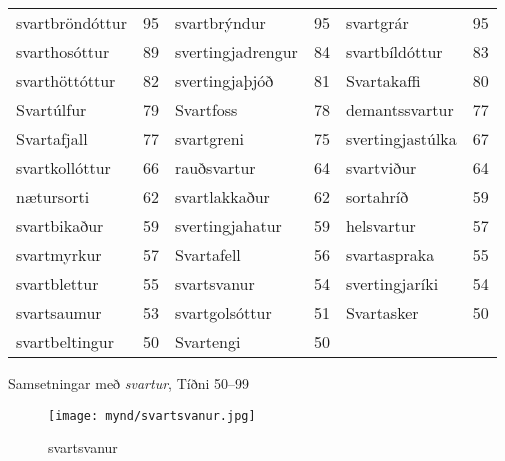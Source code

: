 \documentclass[../samsetningasafn.tex]{subfiles}
\begin{document}
\begin{wordlist}[H]
\begin{tcolorbox}

	\setlength{\extrarowheight}{3pt}
	\begin{tabular}{BlBlBl}
		svartbröndóttur	& 95	& 
		svartbrýndur		& 95	& 
		svartgrár		& 95	\\ 
		svarthosóttur	& 89	& 
		svertingjadrengur	& 84	& 
		svartbíldóttur	& 83	\\ 
		svarthöttóttur	& 82	& 
		svertingjaþjóð	& 81	& 
		Svartakaffi		& 80	\\ 
		Svartúlfur		& 79	& 
		Svartfoss		& 78	& 
		demantssvartur	& 77	\\ 
		Svartafjall		& 77	& 
		svartgreni		& 75	& 
		svertingjastúlka	& 67	\\ 
		svartkollóttur	& 66	& 
		rauðsvartur		& 64	& 
		svartviður		& 64	\\ 
		nætursorti		& 62	& 
		svartlakkaður	& 62	& 
		sortahríð		& 59	\\ 
		svartbikaður		& 59	& 
		svertingjahatur	& 59	& 
		helsvartur		& 57	\\ 
		svartmyrkur		& 57	& 
		Svartafell		& 56	& 
		svartaspraka		& 55	\\ 
		svartblettur		& 55	& 
		svartsvanur		& 54	& 
		svertingjaríki		& 54	\\ 
		svartsaumur		& 53	& 
		svartgolsóttur	& 51	& 
		Svartasker		& 50	\\ 
		svartbeltingur	& 50	& 
		Svartengi		& 50	& 
					&
	\end{tabular}

\end{tcolorbox}
	\caption{Samsetningar með \textit{svartur}, Tíðni 50--99}
	\label{listi:svart.50}
\end{wordlist}

\begin{figure}[H]
\begin{tcolorbox}
\centering
	\texttt{[image: mynd/svartsvanur.jpg]}
\end{tcolorbox}
	\caption{svartsvanur}
	\label{mynd:svartsvanur}
\end{figure}
\end{document}

